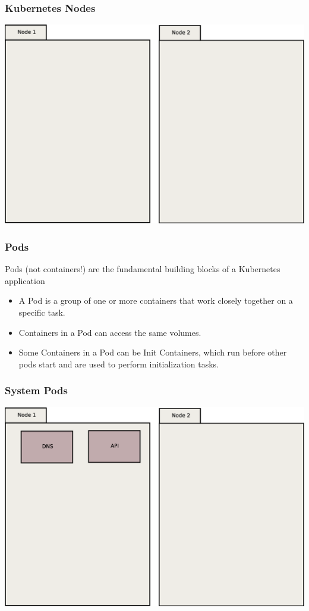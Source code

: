 \documentclass{beamer}
\begin{document}
\begin{frame}
    \frametitle{Kubernetes Nodes}
    \includegraphics[width=\textwidth,height=0.85\textheight,keepaspectratio]{graphics/00-nodes.eps}
\end{frame}

\begin{frame}
\frametitle{Pods}
Pods (not containers!) are the fundamental building blocks of a Kubernetes application
\begin{itemize}
    \item A Pod is a group of one or more containers that work closely together on a specific task.
    \item Containers in a Pod can access the same volumes.
    \item Some Containers in a Pod can be Init Containers, which run before other pods start and are used to perform initialization tasks.
\end{itemize}
\end{frame}

\begin{frame}
    \frametitle{System Pods}
    \includegraphics[width=\textwidth,height=0.85\textheight,keepaspectratio]{graphics/01-systemPods.eps}
\end{frame}
\end{document}
